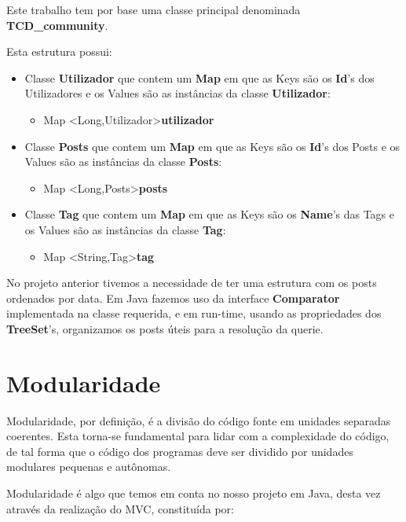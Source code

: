 \documentclass[a4paper]{article}
\begin{document}
Este trabalho tem por base uma classe principal denominada 
\textbf{TCD\_community}.

Esta estrutura possui:
\begin{itemize}
	\item Classe \textbf{Utilizador} que contem um \textbf{Map} em que
    as Keys são os \textbf{Id}'s dos Utilizadores e os Values são as
    instâncias da classe \textbf{Utilizador}:
		\begin{itemize}
          \item Map \textless Long,Utilizador\textgreater \textbf{utilizador}
        \end{itemize}
	\item Classe \textbf{Posts} que contem um \textbf{Map} em que
    as Keys são os \textbf{Id}'s dos Posts e os Values são as
    instâncias da classe \textbf{Posts}:
    	\begin{itemize}
          \item Map \textless Long,Posts\textgreater \textbf{posts}
        \end{itemize}
	\item Classe \textbf{Tag} que contem um \textbf{Map} em que
    as Keys são os \textbf{Name}'s das Tags e os Values são as
    instâncias da classe \textbf{Tag}:
    	\begin{itemize}
          \item Map \textless String,Tag\textgreater \textbf{tag}
        \end{itemize}
\end{itemize}

No projeto anterior tivemos a necessidade de ter uma estrutura com os 
posts ordenados por data. Em Java fazemos uso da interface 
\textbf{Comparator} implementada na classe requerida, e em run-time, 
usando as propriedades dos \textbf{TreeSet}'s, organizamos os posts 
úteis para a resolução da querie.

\section{Modularidade}
\label{sec:modularidade}

Modularidade, por definição, é a divisão do código fonte em unidades 
separadas coerentes. Esta torna-se fundamental para lidar com a complexidade
do código, de tal forma que o código dos programas deve ser dividido por
unidades modulares pequenas e autônomas.

Modularidade é algo que temos em conta no nosso projeto em Java, 
desta vez através da realização do MVC, constituída por:
\end{document}
